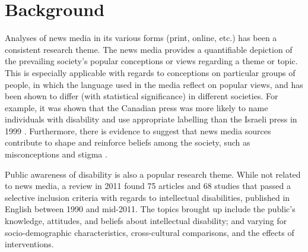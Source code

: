\documentclass{report}
\begin{document}




\section{Background}  %

Analyses of news media in its various forms (print, online, etc.) has been a consistent research theme. 
The news media provides a quantifiable depiction of the prevailing society's popular conceptions or views regarding a theme or topic.
This is especially applicable with regards to conceptions on particular groups of people, in which the language used in the media reflect on popular views, and has been shown to differ (with statistical significance) in different societies.
For example, it was shown that the Canadian press was more likely to name individuals with disability and use appropriate labelling than the Israeli press in 1999 \cite{gold1999media}.
Furthermore, there is evidence to suggest that news media sources contribute to shape and reinforce beliefs among the society, such as misconceptions and stigma \cite{wahl1992mass}.

Public awareness of disability is also a popular research theme.
While not related to news media, a review in 2011 \cite{scior2011public} found 75 articles and 68 studies that passed a selective inclusion criteria with regards to intellectual disabilities, published in English between 1990 and mid-2011.
The topics brought up include the public's knowledge, attitudes, and beliefs about intellectual disability; and varying for socio-demographic characteristics, cross-cultural comparisons, and the effects of interventions.
\end{document}
